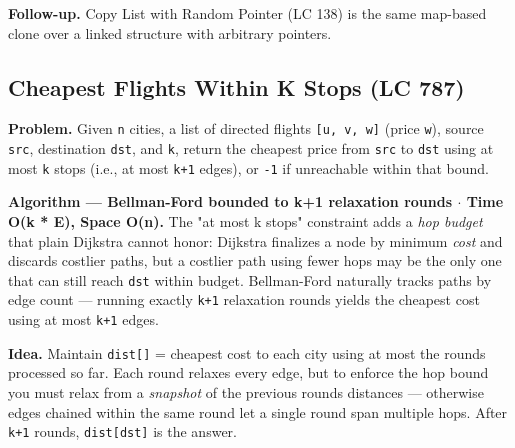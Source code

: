\documentclass[11pt]{article}
\begin{document}
\textbf{Follow-up.} Copy List with Random Pointer (LC 138) is the same map-based clone over a linked structure with arbitrary pointers.

\subsection{Cheapest Flights Within K Stops (LC 787)}\label{cheapest-flights-within-k-stops-lc-787}

\textbf{Problem.} Given \texttt{n} cities, a list of directed flights \texttt{{[}u,\ v,\ w{]}} (price \texttt{w}), source \texttt{src}, destination \texttt{dst}, and \texttt{k}, return the cheapest price from \texttt{src} to \texttt{dst} using at most \texttt{k} stops (i.e., at most \texttt{k+1} edges), or \texttt{-1} if unreachable within that bound.

\textbf{Algorithm --- Bellman-Ford bounded to k+1 relaxation rounds \(\cdot\) Time O(k * E), Space O(n).} The "at most k stops" constraint adds a \emph{hop budget} that plain Dijkstra cannot honor: Dijkstra finalizes a node by minimum \emph{cost} and discards costlier paths, but a costlier path using fewer hops may be the only one that can still reach \texttt{dst} within budget. Bellman-Ford naturally tracks paths by edge count --- running exactly \texttt{k+1} relaxation rounds yields the cheapest cost using at most \texttt{k+1} edges.

\textbf{Idea.} Maintain \texttt{dist{[}{]}} = cheapest cost to each city using at most the rounds processed so far. Each round relaxes every edge, but to enforce the hop bound you must relax from a \emph{snapshot} of the previous round\textquotesingle s distances --- otherwise edges chained within the same round let a single round span multiple hops. After \texttt{k+1} rounds, \texttt{dist{[}dst{]}} is the answer.

\end{document}
